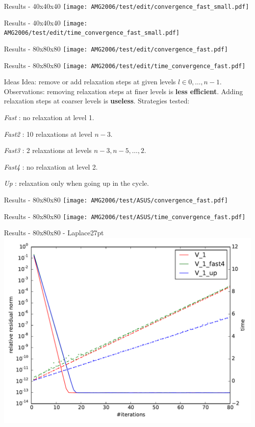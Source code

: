 \documentclass{beamer}
\begin{document}
\begin{frame}{Results - 40x40x40}
 \texttt{[image: AMG2006/test/edit/convergence\_fast\_small.pdf]}
\end{frame}
\begin{frame}{Results - 40x40x40}
 \texttt{[image: AMG2006/test/edit/time\_convergence\_fast\_small.pdf]}
\end{frame}
\begin{frame}{Results - 80x80x80}
 \texttt{[image: AMG2006/test/edit/convergence\_fast.pdf]}
\end{frame}
\begin{frame}{Results - 80x80x80}
 \texttt{[image: AMG2006/test/edit/time\_convergence\_fast.pdf]}
\end{frame}

\begin{frame}{Ideas}
  Idea: remove or add relaxation steps at given levels $l \in 0,\dots,n-1$.\\
  Observations: removing relaxation steps at finer levels is \textbf{less efficient}. Adding relaxation steps at coarser levels is \textbf{useless}.
  Strategies tested:\\
  \begin{itemize}
   \item {\color{mygray}\emph{Fast} : no relaxation at level 1.
   \item \emph{Fast2} : 10 relaxations at level $n-3$.
   \item \emph{Fast3} : 2 relaxations at levels $n-3,n-5,\dots,2$.}
   \item \emph{Fast4} : no relaxation at level 2.
   \item \emph{Up} : relaxation only when going up in the cycle.
  \end{itemize}
\end{frame}
\begin{frame}{Results - 80x80x80}
 \texttt{[image: AMG2006/test/ASUS/convergence\_fast.pdf]}
\end{frame}
\begin{frame}{Results - 80x80x80}
 \texttt{[image: AMG2006/test/ASUS/time\_convergence\_fast.pdf]}
\end{frame}
\begin{frame}{Results - 80x80x80 - Laplace27pt}
 \includegraphics[width=\linewidth]{AMG2006/test/DELL/27pt/convergence_fast_10.pdf}
\end{frame}
\end{document}
